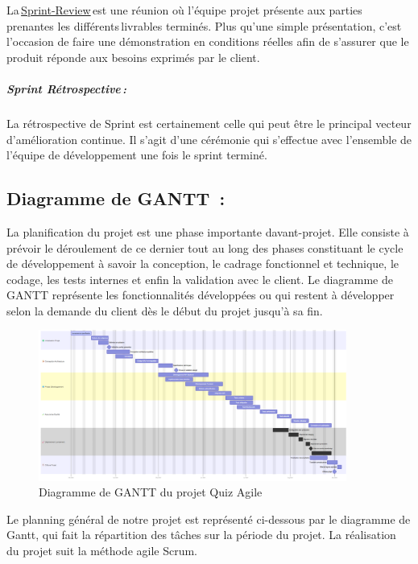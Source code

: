 \documentclass[12pt,a4paper,twoside]{report}
\begin{document}
La\,\href{https://www.appvizer.fr/magazine/operations/gestion-de-projet/sprint-review}{Sprint-Review}\,est
une réunion où l'équipe projet présente aux parties prenantes les
différents\,livrables terminés. Plus qu'une simple présentation, c'est
l'occasion de faire une démonstration en conditions réelles afin de
s'assurer que le produit réponde aux besoins exprimés par le client.~

\hypertarget{sprint-ruxe9trospective}{%
\subparagraph{Sprint Rétrospective\,:~}\label{sprint-ruxe9trospective}}

La rétrospective de Sprint est certainement celle qui peut être le
principal vecteur d'amélioration continue. Il s'agit d'une cérémonie qui
s'effectue avec l'ensemble de l'équipe de développement une fois le
sprint terminé.\,

\hypertarget{diagramme-de-gantt}{%
\subsection{Diagramme de GANTT~:}\label{diagramme-de-gantt}}

La planification du projet est une phase importante
d\textquotesingle avant-projet. Elle consiste à prévoir le déroulement
de ce dernier tout au long des phases constituant le cycle de
développement à savoir la conception, le cadrage fonctionnel et
technique, le codage, les tests internes et enfin la validation avec le
client. Le diagramme de GANTT représente les fonctionnalités développées
ou qui restent à développer selon la demande du client dès le début du
projet jusqu'à sa fin.

\begin{figure}[H]
\centering
\includegraphics[width=0.9\textwidth]{latex_media/media/image10.png}
\caption{Diagramme de GANTT du projet Quiz Agile}
\label{fig:gantt-quiz-agile}
\end{figure}

Le
planning général de notre projet est représenté ci-dessous par le
diagramme de Gantt, qui fait la répartition des tâches sur la période du
projet. La réalisation du projet suit la méthode agile Scrum.~
\end{document}
